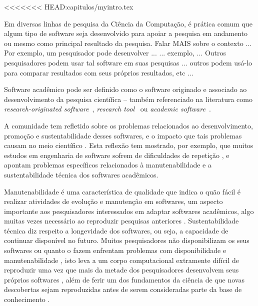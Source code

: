 

<<<<<<< HEAD:capitulos/myintro.tex

Em diversas linhas de pesquisa da Ciência da Computação, é prática comum que algum tipo de software seja desenvolvido para apoiar a pesquisa em andamento ou mesmo como principal resultado da pesquisa.
Falar MAIS sobre o contexto   ... Por exemplo, um pesquisador pode desenvolver ...
... exemplo,  ... Outros pesquisadores podem usar tal software em suas pesquisas ... outros podem usá-lo para comparar resultados com seus próprios resultados, etc ...

Software acadêmico pode ser definido como o software originado e associado ao desenvolvimento da pesquisa científica -- também referenciado na literatura como {\it research-originated software}~\cite{Kon2011}, {\it research tool}~\cite{Portillo12} ou {\it academic software}~\cite{allen2017engineering}. 

A comunidade tem refletido sobre os problemas relacionados ao
desenvolvimento, promoção e sustentabilidade desses softwares, e o
impacto que tais problemas causam no meio científico \cite{allen2017engineering}. Esta
reflexão tem mostrado, por exemplo, que muitos estudos em engenharia de
software sofrem de dificuldades de repetição \cite{Tang2016}, e apontam
problemas específicos relacionados à manutenabilidade e a sustentabilidade
técnica dos softwares acadêmicos.

Manutenabilidade é uma característica de qualidade que indica o quão fácil é
realizar atividades de evolução e manutenção em softwares, um aspecto
importante aos pesquisadores interessados em adaptar softwares acadêmicos, algo
muitas vezes necessário ao reproduzir pesquisas anteriores \cite{Peng2011}.
Sustentabilidade técnica diz respeito a longevidade dos softwares, ou seja, a
capacidade de continuar disponível no futuro. Muitos pesquisadores não
disponibilizam os seus softwares \cite{robles2010replicating,
amann2015software} ou quanto o fazem enfrentam problemas com disponibilidade e
manutenabilidade \cite{Prlic2012}, isto leva a um corpo computacional
extramente difícil de reproduzir uma vez que mais da metade dos pesquisadores
desenvolvem seus próprios softwares \cite{hettrick_2014_14809}, além de ferir um dos
fundamentos da ciência de que novas descobertas sejam reproduzidas antes de
serem consideradas parte da base de conhecimento \cite{Stodden2009}.


